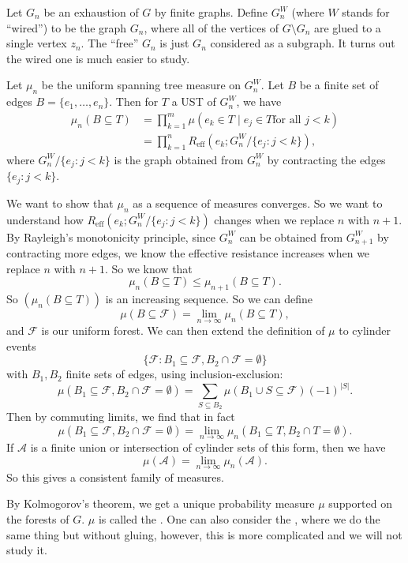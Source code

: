 \documentclass[a4paper]{article}
\begin{document}
Let $G_n$ be an exhaustion of $G$ by finite graphs. Define $G_n^W$ (where $W$ stands for ``wired'') to be the graph $G_n$, where all of the vertices of $G \setminus G_n$ are glued to a single vertex $z_n$. The ``free'' $G_n$ is just $G_n$ considered as a subgraph. It turns out the wired one is much easier to study.

Let $\mu_n$ be the uniform spanning tree measure on $G_n^W$. Let $B$ be a finite set of edges $B = \{e_1, \ldots, e_n\}$. Then for $T$ a UST of $G_n^W$, we have
\begin{align*}
  \mu_n(B \subseteq T) &= \prod_{k = 1}^m \mu(e_k \in T \mid e_j \in T\text{for all }j < k) \\
  &= \prod_{k = 1}^n R_{\mathrm{eff}}(e_k; G_n^W/\{e_j: j < k\}),
\end{align*}
where $G_n^W/\{e_j: j < k\}$ is the graph obtained from $G_n^W$ by contracting the edges $\{e_j: j < k\}$.

We want to show that $\mu_n$ as a sequence of measures converges. So we want to understand how $R_{\mathrm{eff}}(e_k; G_n^W/\{e_j: j < k\})$ changes when we replace $n$ with $n + 1$. By Rayleigh's monotonicity principle, since $G_n^W$ can be obtained from $G_{n + 1}^W$ by contracting more edges, we know the effective resistance increases when we replace $n$ with $n + 1$. So we know that
\[
  \mu_n(B \subseteq T) \leq \mu_{n + 1}(B \subseteq T).
\]
So $(\mu_n(B \subseteq T))$ is an increasing sequence. So we can define
\[
  \mu(B \subseteq \mathcal{F}) = \lim_{n \to \infty} \mu_n(B \subseteq T),
\]
and $\mathcal{F}$ is our uniform forest. We can then extend the definition of $\mu$ to cylinder events
\[
  \{\mathcal{F}: B_1 \subseteq \mathcal{F}, B_2 \cap \mathcal{F} = \emptyset\}
\]
with $B_1, B_2$ finite sets of edges, using inclusion-exclusion:
\[
  \mu(B_1 \subseteq \mathcal{F}, B_2 \cap \mathcal{F} = \emptyset) = \sum_{S \subseteq B_2} \mu(B_1 \cup S \subseteq \mathcal{F}) (-1)^{|S|}.
\]
Then by commuting limits, we find that in fact
\[
  \mu(B_1 \subseteq \mathcal{F}, B_2 \cap \mathcal{F} = \emptyset) = \lim_{n \to \infty} \mu_n (B_1 \subseteq T, B_2 \cap T = \emptyset).
\]
If $\mathcal{A}$ is a finite union or intersection of cylinder sets of this form, then we have
\[
  \mu(\mathcal{A}) = \lim_{n \to \infty} \mu_n(\mathcal{A}).
\]
So this gives a consistent family of measures.

By Kolmogorov's theorem, we get a unique probability measure $\mu$ supported on the forests of $G$. $\mu$ is called the . One can also consider the , where we do the same thing but without gluing, however, this is more complicated and we will not study it.
\end{document}
